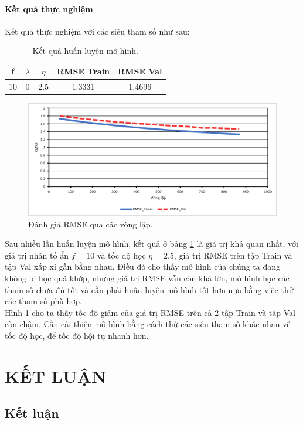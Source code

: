 \subsubsection{Kết quả thực nghiệm}
Kết quả thực nghiệm với các siêu tham số như sau:
\begin{table}[H]
    \centering
    \begin{tabular}{|c|c|c|c|c|}
    \hline
         f&$\lambda$ & $\eta$ & RMSE Train & RMSE Val \\ \hline
         10&0 & 2.5 &  1.3331 & 1.4696\\  \hline
    \end{tabular}
    \caption{Kết quả huấn luyện mô hình.}
    \label{kq}
\end{table}
\newpage
\begin{figure}[H]
    \centering
    \includegraphics[scale = .8]{images/Picture1.png}
    \caption{Đánh giá RMSE qua các vòng lặp.}
    \label{rmse}
\end{figure}
Sau nhiều lần huấn luyện mô hình, kết quả ở bảng \ref{kq} là giá trị khả quan nhất, với giá trị nhân tố ẩn $f=10$ và tốc độ học $\eta= 2.5$, giá trị RMSE trên tập Train và tập Val xấp xỉ gần bằng nhau. Điều đó cho thấy mô hình của chúng ta đang không bị học quá khớp, nhưng giá trị RMSE vẫn còn khá lớn, mô hình học các tham số chưa đủ tốt và cần phải huấn luyện mô hình tốt hơn nữa bằng việc thử các tham số phù hợp.\\
Hình \ref{rmse} cho ta thấy tốc độ giảm của giá trị RMSE trên cả 2 tập Train và tập Val còn chậm. Cần cải thiện mô hình bằng cách thử các siêu tham số khác nhau về tốc độ học, để tốc độ hội tụ nhanh hơn.
\chapter{KẾT LUẬN}
\section{Kết luận}
